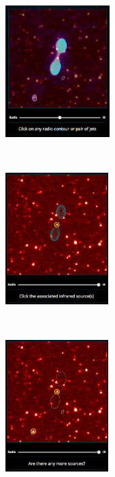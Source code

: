         \begin{figure}
            \centering
            \begin{subfigure}[t]{0.3\textwidth}
                \centering
                \includegraphics[height=2in]{images/rgz_radio.png}
                \caption{}
                \label{fig:rgz-interface-a}
            \end{subfigure}%
            ~
            \begin{subfigure}[t]{0.3\textwidth}
                \centering
                \includegraphics[height=2in]{images/rgz_ir.png}
                \caption{}
                \label{fig:rgz-interface-b}
            \end{subfigure}%
            ~
            \begin{subfigure}[t]{0.3\textwidth}
                \centering
                \includegraphics[height=2in]{images/rgz_done.png}
                \caption{}
                \label{fig:rgz-interface-c}

\end{subfigure}
\end{figure}
